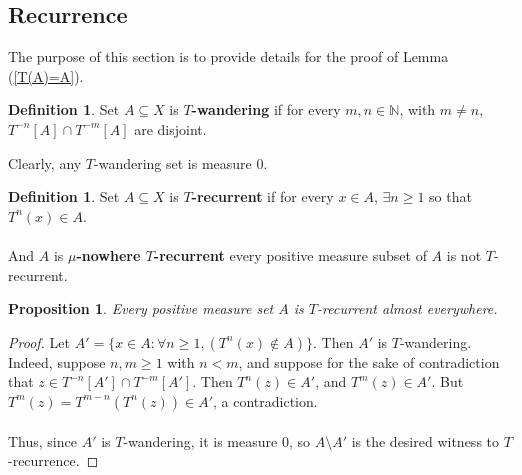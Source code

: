 \documentclass{article}
\let\oldref\ref
\renewcommand{\ref}[1]{(\oldref{#1})}
\newtheorem{proposition}[theorem]{Proposition}
\theoremstyle{definition}
\newtheorem{definition}[theorem]{Definition}
\begin{document}
\subsection{Recurrence}
\noindent The purpose of this section is to provide details for the proof of Lemma \ref{T(A)=A}. 
\begin{definition}
    Set $ A\subseteq X $ is \textbf{$ T $-wandering} if for every $ m,n\in\mathbb{N} $, with $ m\neq n $, $ T^{-n}[A]\cap T^{-m}[A] $ are disjoint. 
\end{definition}
\noindent Clearly, any $ T $-wandering set is measure $ 0 $.
\begin{definition}
    Set $ A\subseteq X $ is \textbf{$ T $-recurrent} if for every $ x\in A $, $ \exists n\geq 1 $ so that $ T^n(x)\in A $. \\\\
    And $ A $ is \textbf{$ \mu $-nowhere $ T $-recurrent} every positive measure subset of $ A $ is not $ T $-recurrent.  
\end{definition}
\begin{proposition}
    Every positive measure set $ A $ is $ T $-recurrent almost everywhere.  
\end{proposition}
\begin{proof}
    Let $ A' = \{x\in A:\forall n\geq 1 ,(T^n(x)\notin A)\} $. Then $ A' $ is $ T $-wandering. Indeed, suppose $ n,m\geq 1 $ with $ n< m $, and suppose for the sake of contradiction that $ z\in T^{-n}[A']\cap T^{-m}[A'] $. Then $ T^n(z)\in A' $, and $ T^m(z)\in A' $. But $ T^m(z) = T^{m-n}(T^n(z)) \in A'$, a contradiction. \\\\
    Thus, since $ A' $ is $ T $-wandering, it is measure $ 0 $, so $ A\setminus A' $ is the desired witness to $ T $-recurrence.
\end{proof}
\end{document}
